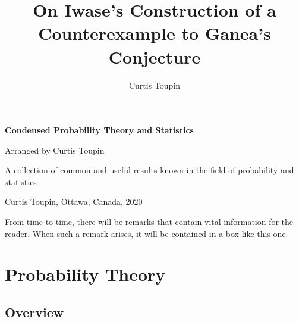 \documentclass[1pt]{report}
\title{On Iwase's Construction of a Counterexample to Ganea's Conjecture}
\author{Curtis Toupin}
\date{}
\newcommand{\<}{\langle}
\renewcommand{\>}{\rangle}
\begin{document}
\pagestyle{fancy}
\begin{titlepage}
        \begin{center}
        \vspace*{1.0cm}

        \huge
        {\bf Condensed Probability Theory and Statistics}

        \vspace*{1.25cm}

        \Large
        Arranged by Curtis Toupin \\

        \vspace*{1.5cm}

        \normalsize
        A collection of common and useful results known in the field of probability and statistics\\
        \vspace*{2.5cm}
        \vspace*{0.5cm}

        {Curtis Toupin}, Ottawa, Canada, 2020\\
        \end{center}
\end{titlepage}
\shipout\null
\setcounter{page}{1}
\setcounter{tocdepth}{1}
\begin{rmkbox}
From time to time, there will be remarks that contain vital information for the reader. When such a remark arises, it will be contained in a box like this one.
\end{rmkbox}
\newpage
\tableofcontents
\newpage
\setcounter{page}{1}
\part{Probability Theory}
\chapter{Overview}
\end{document}
